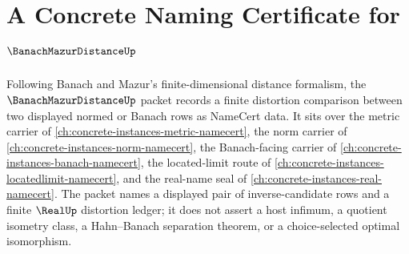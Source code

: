 \chapter{A Concrete Naming Certificate for $\BanachMazurDistanceUp$}
\label{ch:concrete-instances-banach-mazur-distance-namecert}

Following Banach and Mazur's finite-dimensional distance formalism, the $\BanachMazurDistanceUp$ packet records a finite distortion comparison between two displayed normed or Banach rows as NameCert data. It sits over the metric carrier of \autoref{ch:concrete-instances-metric-namecert}, the norm carrier of \autoref{ch:concrete-instances-norm-namecert}, the Banach-facing carrier of \autoref{ch:concrete-instances-banach-namecert}, the located-limit route of \autoref{ch:concrete-instances-locatedlimit-namecert}, and the real-name seal of \autoref{ch:concrete-instances-real-namecert}. The packet names a displayed pair of inverse-candidate rows and a finite $\RealUp$ distortion ledger; it does not assert a host infimum, a quotient isometry class, a Hahn--Banach separation theorem, or a choice-selected optimal isomorphism.

